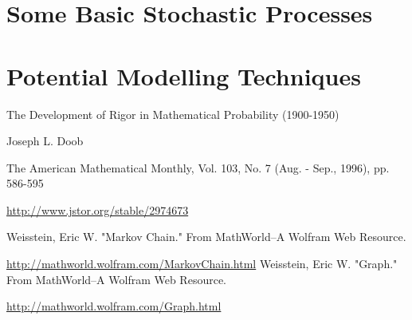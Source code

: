 \documentclass{report}
\begin{document}


\tableofcontents

\chapter{Some Basic Stochastic Processes}



\chapter{Potential Modelling Techniques}



\begin{thebibliography}{9}

	The Development of Rigor in Mathematical Probability (1900-1950)

	Joseph L. Doob

	The American Mathematical Monthly, Vol. 103, No. 7 (Aug. - Sep., 1996), pp. 586-595

	\url{http://www.jstor.org/stable/2974673}

	Weisstein, Eric W. "Markov Chain." From MathWorld--A Wolfram Web Resource. 

	\url{http://mathworld.wolfram.com/MarkovChain.html}
	Weisstein, Eric W. "Graph." From MathWorld--A Wolfram Web Resource. 
	
	\url{http://mathworld.wolfram.com/Graph.html}

\end{thebibliography}
\end{document}

